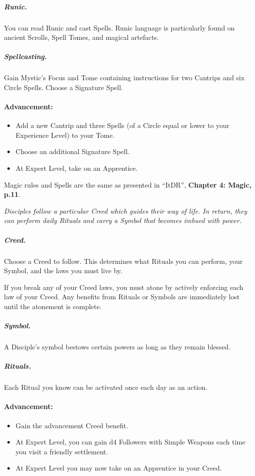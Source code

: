 \documentclass[itdr/core]{subfiles}
\begin{document}
\subparagraph{Runic.}
You can read Runic and cast Spells. Runic language is particularly found on ancient Scrolls, Spell Tomes, and magical artefacts.

\subparagraph{Spellcasting.}
Gain Mystic's Focus and Tome containing instructions for two Cantrips and six  Circle Spells. Choose a Signature Spell.

\paragraph*{Advancement:}
\begin{itemize}
	\item Add a new Cantrip and three Spells (of a Circle equal or lower to your Experience Level) to your Tome.
	\item Choose an additional Signature Spell.
	\item At Expert Level, take on an Apprentice.
\end{itemize}

\skipline

\begin{dbox}
	Magic rules and Spells are the same as presented in ``ItDR'', \textbf{Chapter 4: Magic, p.11}.
\end{dbox}

\skipline


\enlargethispage{\baselineskip}

\vfill
\break

\thispagestyle{classes}

{\em Disciples follow a particular Creed which guides their way of life. In return, they can perform daily Rituals and carry a Symbol that becomes imbued with power.}

\subparagraph{Creed.}
Choose a Creed to follow. This determines what Rituals you can perform, your Symbol, and the laws you must live by.

If you break any of your Creed laws, you must atone by actively enforcing each law of your Creed. Any benefits from Rituals or Symbols are immediately lost until the atonement is complete.

\subparagraph{Symbol.}
A Disciple's symbol bestows certain powers as long as they remain blessed.

\subparagraph{Rituals.}
Each Ritual you know can be activated once each day as an action.

\paragraph*{Advancement:}
\begin{itemize}
	\item Gain the advancement Creed benefit.
	\item  At Expert Level, you can gain d4 Followers with Simple Weapons each time you visit a friendly settlement.
	\item At Expert Level you may now take on an Apprentice in your Creed.
\end{itemize}
\end{document}
